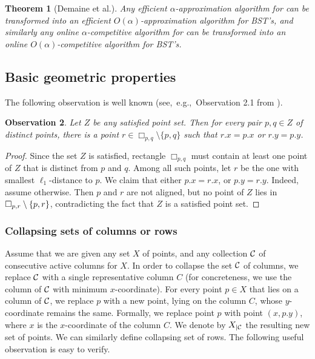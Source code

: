 \documentclass[11pt]{article}
\numberwithin{equation}{section}
\newtheorem{theorem}{Theorem}[section]
\theoremstyle{definition}
\theoremstyle{plain}
\newtheorem{myobs}[theorem]{Observation}
\begin{document}
%
\begin{theorem}[Demaine et al.]    %
Any efficient $\alpha$-approximation algorithm for \minsat can be transformed into an efficient $O(\alpha)$-approximation algorithm for BST's, and similarly any online $\alpha$-competitive algorithm for \minsat can be transformed into an online $O(\alpha)$-competitive algorithm for BST's. 
\end{theorem} 

%






	\subsection{Basic geometric properties }

	The following observation is well known (see,~e.g.,~Observation 2.1 from \cite{DHIKP09}). 
\begin{myobs}
        \label{obs: aligned point} 
        Let $Z$ be  any satisfied point set. Then for every pair $p,q \in Z$ of distinct points, there is a point $r \in \Box_{p,q} \setminus \{p,q\}$ such that $r.x = p.x$ or $r.y = p.y$. 
\end{myobs}
\begin{proof}
Since the set $Z$ is satisfied, rectangle $\Box_{p,q} $ must contain at least one point of $Z$ that is distinct from $p$ and $q$. Among all such points, let $r$ be the one with smallest $\ell_1$-distance to $p$. We claim that either $p.x=r.x$, or $p.y=r.y$. Indeed, assume otherwise. Then $p$ and $r$ are not aligned, but no point of $Z$ lies in $\Box_{p,r}\setminus\left\{ p,r \right\}$, contradicting the fact that $Z$ is a satisfied point set.
\end{proof}



\subsubsection{Collapsing sets of columns or rows}
Assume that we are given any set $X$ of points, and any collection ${\mathcal C}$ of consecutive active columns for $X$. 
In order to collapse the set ${\mathcal C}$ of columns, we replace ${\mathcal C}$ with a single representative column $C$ (for concreteness, we use the column of ${\mathcal C}$ with minimum $x$-coordinate). 
For every point $p\in X$ that lies on a column of ${\mathcal C}$, we replace $p$ with a new point, lying on the column $C$, whose $y$-coordinate remains the same.
Formally, we replace point $p$ with point $(x, p.y)$, where $x$ is the $x$-coordinate of the column $C$.  
We denote by $X_{|{\mathcal C}}$ the resulting new set of points. We can similarly define collapsing set of rows. The following useful observation is easy to verify.%
\end{document}
